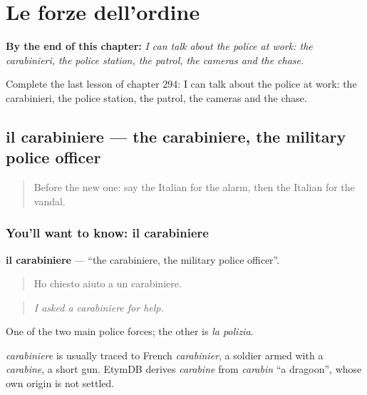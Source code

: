 
\chapter{Le forze dell'ordine}
\label{ch:it-le-forze-dell-ordine}

\begin{chapteropening}
\textbf{By the end of this chapter:} \emph{I can talk about the police at work: the carabinieri, the police station, the patrol, the cameras and the chase.}

Complete the last lesson of chapter 294: I can talk about the police at work: the carabinieri, the police station, the patrol, the cameras and the chase.
\end{chapteropening}

\section[il carabiniere]{il carabiniere — the carabiniere, the military police officer}

\label{lesson:IT-C294-carabiniere}



\begin{quote}
Before the new one: say the Italian for the alarm, then the Italian for the vandal.
\end{quote}

\subsection*{You'll want to know: il carabiniere}
\textbf{il carabiniere} — \textquotedblleft{}the carabiniere, the military police officer\textquotedblright{}.

\begin{quote}
Ho chiesto aiuto a un carabiniere.
\end{quote}

\begin{quote}
\emph{I asked a carabiniere for help.}
\end{quote}

One of the two main police forces; the other is \emph{la polizia}.

\begin{cousinweb}
\emph{carabiniere} is usually traced to French \emph{carabinier}, a soldier armed with a \emph{carabine}, a short gun. EtymDB derives \emph{carabine} from \emph{carabin} \textquotedblleft{}a dragoon\textquotedblright{}, whose own origin is not settled.
\end{cousinweb}


